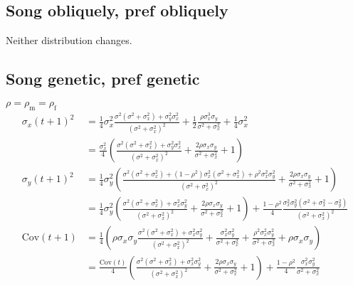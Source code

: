\documentclass{article}
\newcommand{\x}[1]{\text{#1}}
\newcommand{\Cov}{\text{Cov}}
\begin{document}
\subsection{Song obliquely, pref obliquely }
Neither distribution changes.
\subsection{Song genetic, pref genetic } 
$\rho=\rho_\x{m}=\rho_\x{f}$
\begin{align*}
\sigma_x(t+1)^2&=\frac{1}{4}\sigma_x^2\frac{\sigma^2(\sigma^2+\sigma_x^2)+\sigma_y^2\sigma_x^2}{(\sigma^2+\sigma_x^2)^2}+\frac{1}{2}\frac{\rho\sigma_x^3\sigma_y}{\sigma^2+\sigma_x^2}+\frac{1}{4}\sigma_x^2
\\&=\frac{\sigma_x^2}{4}\left(\frac{\sigma^2(\sigma^2+\sigma_x^2)+\sigma_y^2\sigma_x^2}{(\sigma^2+\sigma_x^2)^2}+\frac{2\rho\sigma_x\sigma_y}{\sigma^2+\sigma_x^2}+1\right)
\\\sigma_y(t+1)^2&=\frac{1}{4}\sigma_y^2\left(\frac{\sigma^2(\sigma^2+\sigma_x^2)+(1-\rho^2)\sigma_x^2(\sigma^2+\sigma_x^2)+\rho^2\sigma_x^2\sigma_y^2}{(\sigma^2+\sigma_x^2)^2}+\frac{2\rho\sigma_x\sigma_y}{\sigma^2+\sigma_x^2}+1\right)
\\&=\frac{1}{4}\sigma_y^2\left(\frac{\sigma^2(\sigma^2+\sigma_x^2)+\sigma_x^2\sigma_y^2}{(\sigma^2+\sigma_x^2)^2}+\frac{2\rho\sigma_x\sigma_y}{\sigma^2+\sigma_x^2}+1\right)+\frac{1-\rho^2}{4}\frac{\sigma_x^2\sigma_y^2(\sigma^2+\sigma_x^2-\sigma_y^2)}{(\sigma^2+\sigma_x^2)^2}
\\ \Cov(t+1)&=\frac{1}{4}\left(\rho\sigma_x\sigma_y\frac{\sigma^2(\sigma^2+\sigma_x^2)+\sigma_x^2\sigma_y^2}{(\sigma^2+\sigma_x^2)^2}+\frac{\sigma_x^2\sigma_y^2}{\sigma^2+\sigma_x^2}+\frac{\rho^2\sigma_x^2\sigma_y^2}{\sigma^2+\sigma_x^2}+\rho\sigma_x\sigma_y\right)
\\&=\frac{\Cov(t)}{4}\left(\frac{\sigma^2(\sigma^2+\sigma_x^2)+\sigma_x^2\sigma_y^2}{(\sigma^2+\sigma_x^2)^2}+\frac{2\rho\sigma_x\sigma_y}{\sigma^2+\sigma_x^2}+1\right)+\frac{1-\rho^2}{4}\frac{\sigma_x^2\sigma_y^2}{\sigma^2+\sigma_x^2}
\end{align*}
\end{document}
